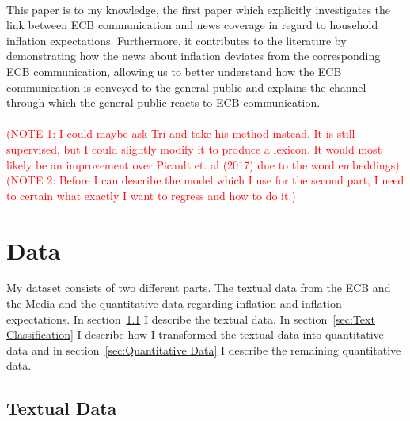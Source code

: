 \documentclass[review]{elsarticle}
\begin{document}
\\
This paper is to my knowledge, the first paper which explicitly investigates the link between ECB communication and news coverage in regard to household inflation expectations. Furthermore, it contributes to the literature by demonstrating how the news about inflation deviates from the corresponding ECB communication, allowing us to better understand how the ECB communication is conveyed to the general public and explains the channel through which the general public reacts to ECB communication.
\\
\\
\textcolor{red}{(NOTE 1: I could maybe ask Tri and take his method instead. It is still supervised, but I could slightly modify it to produce a lexicon. It would most likely be an improvement over Picault et. al (2017) due to the word embeddings)}
\textcolor{red}{(NOTE 2: Before I can describe the model which I use for the second part, I need to certain what exactly I want to regress and how to do it.)}
\section{Data} \label{sec:Data}

My dataset consists of two different parts. The textual data from the ECB and the Media and the quantitative data regarding inflation and inflation expectations. In  section~\ref{sec:Textual Data} I describe the textual data. In section~\ref{sec:Text Classification} I describe how I transformed the textual data into quantitative data and in section~\ref{sec:Quantitative Data} I describe the remaining quantitative data.

\subsection{Textual Data} \label{sec:Textual Data}
\end{document}
